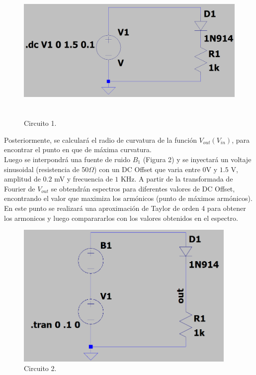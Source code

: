 \documentclass[letterpaper,oneside]{article}
\begin{document}
\begin{figure}
  \centering
  \includegraphics[height=7cm]{../graficos/circuito1.png}
  \caption{Circuito 1.}
\end{figure}

Posteriormente, se calculará el radio de curvatura de la función $V_{out}(V_{in})$, para encontrar el punto en que de máxima curvatura.\\

Luego se interpondrá una fuente de ruido $B_1$ (Figura 2) y se inyectará un voltaje sinusoidal (resistencia de 50$\Omega$) con un DC Offset que varia entre $0$V y $1.5$ V, amplitud de $0.2$ mV y frecuencia de $1$ KHz. A partir de la transformada de Fourier de $V_{out}$ se obtendrán espectros para diferentes valores de DC Offset, encontrando el valor que maximiza los armónicos (punto de máximos armónicos). En este punto se realizará una aproximación de Taylor de orden 4  para obtener los armonicos y luego comparararlos con los valores obtenidos en el espectro.\\

\begin{figure}
  \centering
  \includegraphics[height=7cm]{../graficos/circuito2.png}
  \caption{Circuito 2.}
\end{figure}
\end{document}
